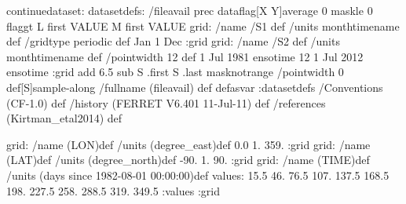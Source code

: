 \begin{ingrid}
continuedataset:
datasetdefs:
/fileavail {
prec dataflag[X Y]average 0 maskle 0 flaggt L first VALUE M first VALUE grid: /name /S1 def /units monthtimename def /gridtype periodic def Jan 1 Dec :grid grid: /name /S2 def /units monthtimename def /pointwidth 12 def 1 Jul 1981 ensotime 12 1 Jul 2012 ensotime :grid add 6.5 sub S .first S .last masknotrange /pointwidth 0 def[S]sample-along /fullname (fileavail) def
} defasvar
:datasetdefs
 /Conventions (CF-1.0) def
 /history (FERRET V6.401   11-Jul-11) def
 /references (Kirtman_etal2014) def
\end{ingrid}
grid:
/name (LON)def
/units (degree_east)def
 0.0 1. 359.
:grid
grid:
/name (LAT)def
/units (degree_north)def
 -90. 1. 90.
:grid
grid:
/name (TIME)def
/units (days since 1982-08-01 00:00:00)def
values: 15.5 46. 76.5 107. 137.5 168.5 198. 227.5 258. 288.5 319. 349.5 :values
:grid
